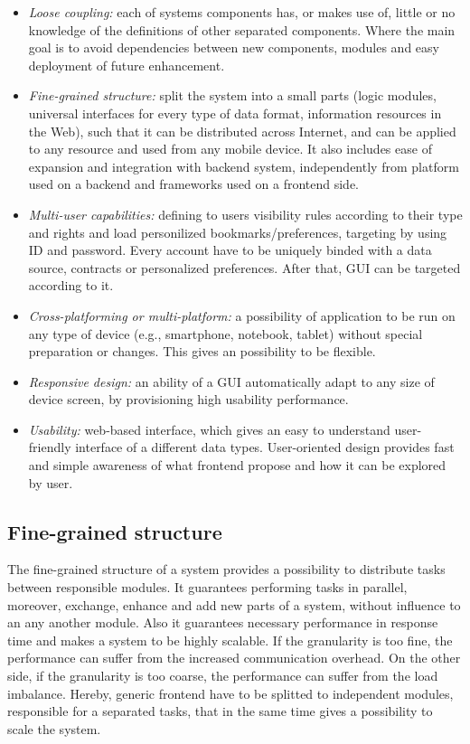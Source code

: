 \begin{itemize}
\item \emph{Loose coupling:} each of systems components has, or makes use of, little or no knowledge of the definitions of other separated components. Where the main goal is to avoid dependencies between new components, modules and easy deployment of future enhancement.
\item \emph{Fine-grained structure:} split the system into a small parts (logic modules, universal interfaces for every type of data format, information resources in the Web), such that it can be distributed across Internet, and can be applied to any resource and used from any mobile device. It also includes ease of expansion and integration with backend system, independently from platform used on a backend and frameworks used on a frontend side.
\item \emph{Multi-user capabilities:} defining to users visibility rules according to their type and rights and load personilized bookmarks/preferences, targeting by using ID and password. Every account have to be uniquely binded with a data source, contracts or personalized preferences. After that, GUI can be targeted according to it.
\item \emph{Cross-platforming or multi-platform:} a possibility of application to be run on any type of device (e.g., smartphone, notebook, tablet) without special preparation or changes. This gives an possibility to be flexible.
\item \emph{Responsive design:} an ability of a GUI automatically adapt to any size of device screen, by provisioning high usability performance.
\item \emph{Usability:} web-based interface, which gives an easy to understand user-friendly interface of a different data types. User-oriented design provides fast and simple awareness of what frontend propose and how it can be explored by user.
\end{itemize} 

\subsection {Fine-grained structure}
The fine-grained structure of a system provides a possibility to distribute tasks between responsible modules. It guarantees performing tasks in parallel, moreover, exchange, enhance and add new parts of a system, without influence to an any another module. Also it guarantees necessary performance in response time and makes a system to be highly scalable. If the granularity is too fine, the performance can suffer from the increased communication overhead. On the other side, if the granularity is too coarse, the performance can suffer from the load imbalance. Hereby, generic frontend have to be splitted to independent modules, responsible for a separated tasks, that in the same time gives a possibility to scale the system. 

